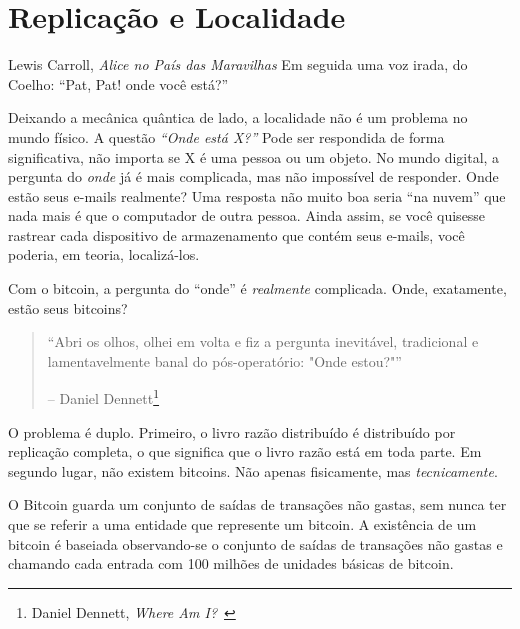 \chapter{Replicação e Localidade}
\label{les:3}

\begin{chapquote}{Lewis Carroll, \textit{Alice no País das Maravilhas}}
Em seguida uma voz irada, do Coelho: \enquote{Pat, Pat! onde você está?}
\end{chapquote}

Deixando a mecânica quântica de lado, a localidade não é um problema no mundo físico. A questão \textit{\enquote{Onde está X?}} Pode ser respondida de forma significativa, não importa se X é uma pessoa ou um objeto. No mundo digital, a pergunta do \textit{onde} já é mais complicada, mas não impossível de responder. Onde estão seus e-mails realmente? Uma resposta não muito boa seria \enquote{na nuvem} que nada mais é que o computador de outra pessoa. Ainda assim, se você quisesse rastrear cada dispositivo de armazenamento que contém seus e-mails, você poderia, em teoria, localizá-los.

Com o bitcoin, a pergunta do \enquote{onde} é \textit{realmente} complicada. Onde, exatamente, estão seus bitcoins?

\begin{quotation}\begin{samepage}
\enquote{Abri os olhos, olhei em volta e fiz a pergunta inevitável, tradicional e lamentavelmente banal do pós-operatório: "Onde estou?"}
\begin{flushright} -- Daniel Dennett\footnote{Daniel Dennett, \textit{Where Am I?}~\cite{where-am-i}}
\end{flushright}\end{samepage}\end{quotation}

O problema é duplo. Primeiro, o livro razão distribuído é distribuído por replicação completa, o que significa que o livro razão está em toda parte. Em segundo lugar, não existem bitcoins. Não apenas fisicamente, mas \textit{tecnicamente}.

O Bitcoin guarda um conjunto de saídas de transações não gastas, sem nunca ter que se referir a uma entidade que represente um bitcoin. A existência de um bitcoin é baseiada observando-se o conjunto de saídas de transações não gastas e chamando cada entrada com 100 milhões de unidades básicas de bitcoin.

